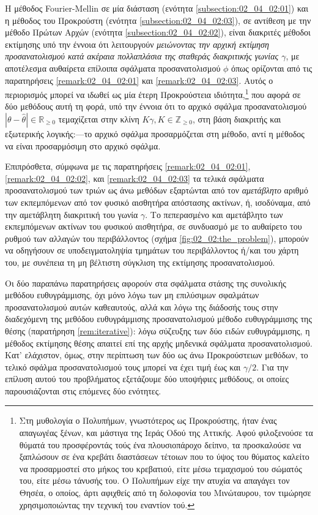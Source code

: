 Η μέθοδος Fourier-Mellin σε μία διάσταση (ενότητα \ref{subsection:02_04_02:01})
και η μέθοδος του Προκρούστη (ενότητα \ref{subsection:02_04_02:03}), σε
αντίθεση με την μέθοδο Πρώτων Αρχών (ενότητα \ref{subsection:02_04_02:02}),
είναι διακριτές μέθοδοι εκτίμησης υπό την έννοια ότι λειτουργούν
\textit{μειώνοντας την αρχική εκτίμηση προσανατολισμού κατά ακέραια πολλαπλάσια
της σταθεράς διακριτικής γωνίας $\gamma$}, με αποτέλεσμα αυθαίρετα επίλοιπα
σφάλματα προσανατολισμού $\phi$ όπως ορίζονται από τις παρατηρήσεις
\ref{remark:02_04_02:01} και \ref{remark:02_04_02:03}. Αυτός ο περιορισμός
μπορεί να ιδωθεί ως μία έτερη Προκρούστεια ιδιότητα,\footnote{Στη μυθολογία ο
Πολυπήμων, γνωστότερος ως Προκρούστης, ήταν ένας απαγωγέας ξένων, και μάστιγα
της Ιεράς Οδού της Αττικής. Αφού φιλοξενούσε τα θύματά του προσφέροντάς τούς
ένα πλουσιοπάροχο δείπνο, τα προσκαλούσε να ξαπλώσουν σε ένα κρεβάτι διαστάσεων
τέτοιων που το ύψος του θύματος καλείτο να προσαρμοστεί στο μήκος του
κρεβατιού, είτε μέσω τεμαχισμού του σώματός του, είτε μέσω τάνυσής του. Ο
Πολυπήμων είχε την ατυχία να απαγάγει τον Θησέα, ο οποίος, άρτι αφιχθείς από τη
δολοφονία του Μινώταυρου, τον τιμώρησε χρησιμοποιώντας την τεχνική του εναντίον
τού.} που αφορά σε δύο μεθόδους αυτή τη φορά, υπό την έννοια ότι το αρχικό
σφάλμα προσανατολισμού $|\theta - \hat{\theta}| \in \mathbb{R}_{\geq 0}$
τεμαχίζεται στην κλίνη $K\gamma, K \in \mathbb{Z}_{\geq 0}$, στη βάση διακριτής
και εξωτερικής λογικής:---το αρχικό σφάλμα προσαρμόζεται στη μέθοδο, αντί η
μέθοδος να είναι προσαρμόσιμη στο αρχικό σφάλμα.

Επιπρόσθετα, σύμφωνα με τις παρατηρήσεις \ref{remark:02_04_02:01},
\ref{remark:02_04_02:02}, και \ref{remark:02_04_02:03} τα τελικά σφάλματα
προσανατολισμού των τριών ως άνω μεθόδων εξαρτώνται από τον \textit{αμετάβλητο}
αριθμό των εκπεμπόμενων από τον φυσικό αισθητήρα απόστασης ακτίνων, ή,
ισοδύναμα, από την αμετάβλητη διακριτική του γωνία $\gamma$. Το πεπερασμένο και
αμετάβλητο των εκπεμπόμενων ακτίνων του φυσικού αισθητήρα, σε συνδυασμό με το
αυθαίρετο του ρυθμού των αλλαγών του περιβάλλοντος (σχήμα
\ref{fig:02_02:the_problem}), μπορούν να οδηγήσουν σε υποδειγματοληψία τμημάτων
του περιβάλλοντος ή/και του χάρτη του, με συνέπεια τη μη βέλτιστη σύγκλιση της
εκτίμησης προσανατολισμού.

Οι δύο παραπάνω παρατηρήσεις αφορούν στα σφάλματα στάσης της συνολικής μεθόδου
ευθυγράμμισης, όχι μόνο λόγω των μη επιλύσιμων σφαλμάτων προσανατολισμού αυτών
καθεαυτούς, αλλά και λόγω της διάδοσής τους στην διαδεχόμενη της μεθόδου
ευθυγράμμισης προσανατολισμού μέθοδο ευθυγράμμισης της θέσης (παρατήρηση
\ref{rem:iterative}): λόγω σύζευξης των δύο ειδών ευθυγράμμισης, η μέθοδος
εκτίμησης θέσης απαιτεί επί της αρχής μηδενικά σφάλματα προσανατολισμού. Κατ'
ελάχιστον, όμως, στην περίπτωση των δύο ως άνω Προκρούστειων μεθόδων, το τελικό
σφάλμα προσανατολισμού τους μπορεί να έχει τιμή έως και $\gamma/2$. Για την
επίλυση αυτού του προβλήματος εξετάζουμε δύο υποψήφιες μεθόδους, οι οποίες
παρουσιάζονται στις επόμενες δύο ενότητες.



